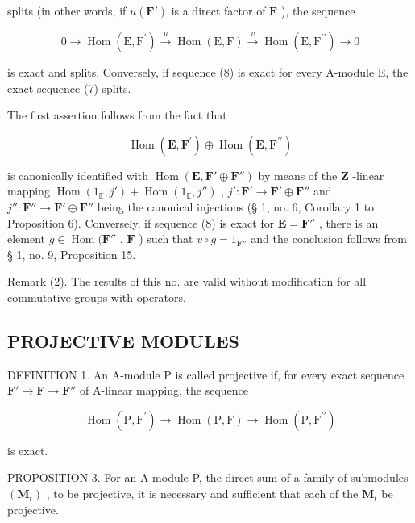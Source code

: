 splits (in other words, if \(u(\mathbf{F}')\) is a direct factor of \(\mathbf{F}\) ), the sequence

\[
0 \longrightarrow \operatorname{Hom} (\mathrm{E}, \mathrm{F} ^ {\prime}) \stackrel {\bar {u}} {\longrightarrow} \operatorname{Hom} (\mathrm{E}, \mathrm{F}) \stackrel {\bar {v}} {\longrightarrow} \operatorname{Hom} (\mathrm{E}, \mathrm{F} ^ {\prime \prime}) \longrightarrow 0\tag{8}
\]

is exact and splits. Conversely, if sequence (8) is exact for every A-module E, the exact sequence (7) splits.

The first assertion follows from the fact that

\[
\operatorname{Hom} (\mathbf {E}, \mathbf {F} ^ {\prime}) \oplus \operatorname{Hom} (\mathbf {E}, \mathbf {F} ^ {\prime \prime})
\]

is canonically identified with \(\operatorname{Hom}(\mathbf{E}, \mathbf{F}' \oplus \mathbf{F}'')\) by means of the \(\mathbf{Z}\) -linear mapping \(\operatorname{Hom}(1_{\mathbb{E}}, j') + \operatorname{Hom}(1_{\mathbb{E}}, j'')\) , \(j': \mathbf{F}' \to \mathbf{F}' \oplus \mathbf{F}''\) and \(j'': \mathbf{F}'' \to \mathbf{F}' \oplus \mathbf{F}''\) being the canonical injections (§ 1, no. 6, Corollary 1 to Proposition 6). Conversely, if sequence (8) is exact for \(\mathbf{E} = \mathbf{F}''\) , there is an element \(g \in \operatorname{Hom}(\mathbf{F}''\) , \(\mathbf{F}\) ) such that \(v \circ g = 1_{\mathbf{F}''}\) and the conclusion follows from § 1, no. 9, Proposition 15.

Remark (2). The results of this no. are valid without modification for all commutative groups with operators.

\subsection{PROJECTIVE MODULES}

DEFINITION 1. An A-module P is called projective if, for every exact sequence \(\mathbf{F}' \to \mathbf{F} \to \mathbf{F}''\) of A-linear mapping, the sequence

\[
\operatorname{Hom} (\mathrm{P}, \mathrm{F} ^ {\prime}) \rightarrow \operatorname{Hom} (\mathrm{P}, \mathrm{F}) \rightarrow \operatorname{Hom} (\mathrm{P}, \mathrm{F} ^ {\prime \prime})
\]

is exact.

PROPOSITION 3. For an A-module P, the direct sum of a family of submodules \((\mathbf{M}_{t})\) , to be projective, it is necessary and sufficient that each of the \(\mathbf{M}_{t}\) be projective.

